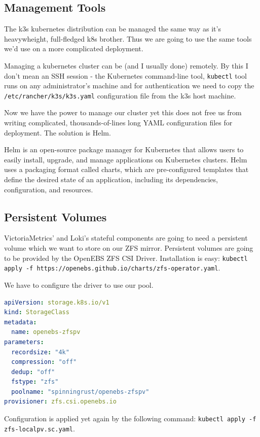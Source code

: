 \subsection{Management Tools}

The k3s kubernetes distribution can be managed the same way as it's
heavywheight, full-fledged k8s brother. Thus we are going to use the same tools
we'd use on a more complicated deployment.

Managing a kubernetes cluster can be (and I usually done) remotely. By this I
don't mean an SSH session - the Kubernetes command-line tool, \verb+kubectl+
tool runs on any administrator's machine and for authentication we need to copy
the \verb+/etc/rancher/k3s/k3s.yaml+ configuration file from the k3s host
machine.

Now we have the power to manage our cluster yet this does not free us from
writing complicated, thousands-of-lines long YAML configuration files for
deployment. The solution is Helm.

Helm is an open-source package manager for Kubernetes that allows users to
easily install, upgrade, and manage applications on Kubernetes clusters. Helm
uses a packaging format called charts, which are pre-configured templates that
define the desired state of an application, including its dependencies,
configuration, and resources.

\subsection{Persistent Volumes}

VictoriaMetrics' and Loki's stateful components are going to need a persistent
volume which we want to store on our ZFS mirror. Persistent volumes are going
to be provided by the OpenEBS ZFS CSI Driver. Installation is easy:
\verb+kubectl apply -f https://openebs.github.io/charts/zfs-operator.yaml+.

We have to configure the driver to use our pool.

\begin{lstlisting}[language=yaml,caption=zfs-localpv.sc.yaml]
apiVersion: storage.k8s.io/v1
kind: StorageClass
metadata:
  name: openebs-zfspv
parameters:
  recordsize: "4k"
  compression: "off"
  dedup: "off"
  fstype: "zfs"
  poolname: "spinningrust/openebs-zfspv"
provisioner: zfs.csi.openebs.io
\end{lstlisting}

Configuration is applied yet again by the following command:
\verb+kubectl apply -f zfs-localpv.sc.yaml+.

